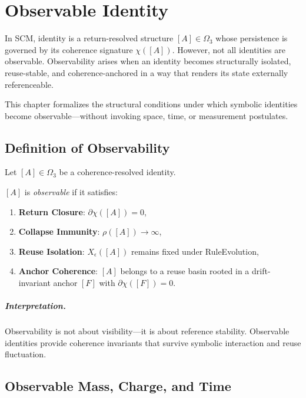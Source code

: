 \chapter{Observable Identity} \label{chapter-observable-identity}

In SCM, identity is a return-resolved structure $[A] \in \Omega_3$ whose persistence is governed by its coherence signature $\chi([A])$. However, not all identities are observable. Observability arises when an identity becomes structurally isolated, reuse-stable, and coherence-anchored in a way that renders its state externally referenceable.

This chapter formalizes the structural conditions under which symbolic identities become observable—without invoking space, time, or measurement postulates.

\section{Definition of Observability} \label{sec:def-observability}

Let $[A] \in \Omega_3$ be a coherence-resolved identity.

\begin{definition}
$[A]$ is \emph{observable} if it satisfies:
\begin{enumerate}
    \item \textbf{Return Closure}: $\partial\chi([A]) = 0$,
    \item \textbf{Collapse Immunity}: $\rho([A]) \to \infty$,
    \item \textbf{Reuse Isolation}: $X_\epsilon([A])$ remains fixed under RuleEvolution,
    \item \textbf{Anchor Coherence}: $[A]$ belongs to a reuse basin rooted in a drift-invariant anchor $[F]$ with $\partial\chi([F]) = 0$.
\end{enumerate}
\end{definition}

\paragraph{Interpretation.}
Observability is not about visibility—it is about reference stability. Observable identities provide coherence invariants that survive symbolic interaction and reuse fluctuation.

\section{Observable Mass, Charge, and Time} \label{sec:observable-quantities}

